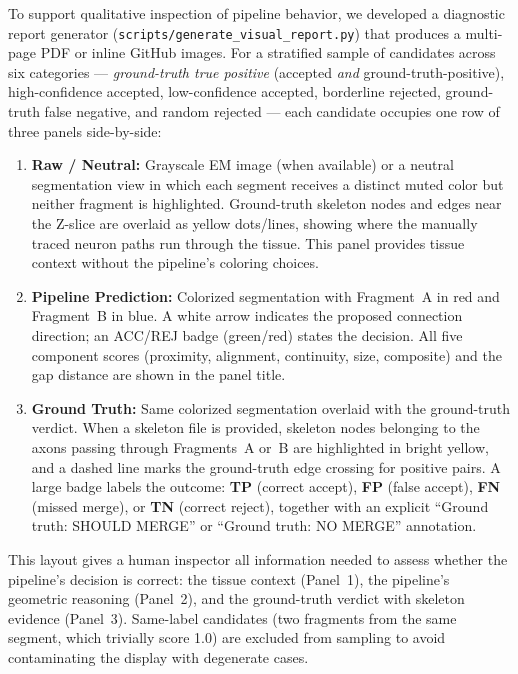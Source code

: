 To support qualitative inspection of pipeline behavior, we developed a diagnostic
report generator (\texttt{scripts/generate\_visual\_report.py}) that produces a
multi-page PDF or inline GitHub images.  For a stratified sample of candidates
across six categories --- \emph{ground-truth true positive} (accepted \emph{and}
ground-truth-positive), high-confidence accepted, low-confidence accepted,
borderline rejected, ground-truth false negative, and random rejected --- each
candidate occupies one row of three panels side-by-side:

\begin{enumerate}
  \item \textbf{Raw / Neutral:} Grayscale EM image (when available) or a
        neutral segmentation view in which each segment receives a distinct
        muted color but neither fragment is highlighted. Ground-truth skeleton
        nodes and edges near the Z-slice are overlaid as yellow dots/lines,
        showing where the manually traced neuron paths run through the tissue.
        This panel provides tissue context without the pipeline's coloring
        choices.

  \item \textbf{Pipeline Prediction:} Colorized segmentation with Fragment~A
        in red and Fragment~B in blue. A white arrow indicates the proposed
        connection direction; an ACC/REJ badge (green/red) states the decision.
        All five component scores (proximity, alignment, continuity, size,
        composite) and the gap distance are shown in the panel title.

  \item \textbf{Ground Truth:} Same colorized segmentation overlaid with the
        ground-truth verdict.  When a skeleton file is provided, skeleton
        nodes belonging to the axons passing through Fragments~A or~B are
        highlighted in bright yellow, and a dashed line marks the
        ground-truth edge crossing for positive pairs.  A large badge labels
        the outcome: \textbf{TP} (correct accept), \textbf{FP} (false
        accept), \textbf{FN} (missed merge), or \textbf{TN} (correct reject),
        together with an explicit ``Ground truth: SHOULD MERGE'' or
        ``Ground truth: NO MERGE'' annotation.
\end{enumerate}

This layout gives a human inspector all information needed to assess whether
the pipeline's decision is correct: the tissue context (Panel~1), the
pipeline's geometric reasoning (Panel~2), and the ground-truth verdict with
skeleton evidence (Panel~3).  Same-label candidates (two fragments from the
same segment, which trivially score 1.0) are excluded from sampling to avoid
contaminating the display with degenerate cases.

